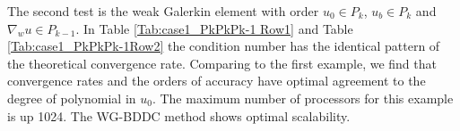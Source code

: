 				
				
				The second test is the weak Galerkin element with order $ u_{0} \in P_{k} $, $ u_{b} \in P_{k} $ and $ \nabla_{w}u \in P_{k - 1} $. In Table \ref{Tab:case1_PkPkPk-1 Row1} and Table \ref{Tab:case1_PkPkPk-1Row2} the condition number has the identical pattern of the theoretical convergence rate. Comparing to the first example, we find that convergence rates and the orders of accuracy have optimal agreement to the degree of polynomial in $ u_{0} $. The maximum number of processors for this example is up 1024. The WG-BDDC method shows optimal scalability.
				
				
